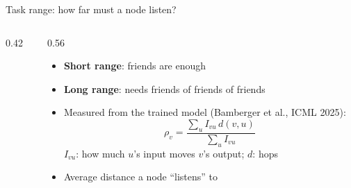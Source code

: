 \documentclass[aspectratio=169,10pt]{beamer}
\newcommand{\snote}[1]{{\scriptsize\textcolor{ink!70}{#1}}}
\begin{document}
\begin{frame}{Task range: how far must a node listen?}
  \begin{columns}[c]
    \begin{column}{0.42\textwidth}
      \centering
    \end{column}
    \begin{column}{0.56\textwidth}
      \begin{itemize}
        \item \textbf{Short range}: friends are enough
        \item \textbf{Long range}: needs friends of friends of friends
        \item Measured from the trained model \snote{(Bamberger et al., ICML 2025)}:
          \[ \rho_v = \frac{\sum_u I_{vu}\, d(v,u)}{\sum_u I_{vu}} \]
          \snote{$I_{vu}$: how much $u$'s input moves $v$'s output; $d$: hops}
        \item Average distance a node ``listens'' to
      \end{itemize}
    \end{column}
  \end{columns}
\end{frame}
\end{document}
